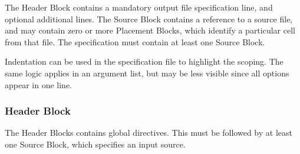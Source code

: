 The Header Block contains a mandatory output file specification line,
and optional additional lines.  The Source Block contains a reference
to a source file, and may contain zero or more Placement Blocks, which
identify a particular cell from that file.  The specification must
contain at least one Source Block.

Indentation can be used in the specification file to highlight the
scoping.  The same logic applies in an argument list, but may be less
visible since all options appear in one line.

\subsubsection{Header Block}

The Header Blocks contains global directives.  This must be followed
by at least one Source Block, which specifies an input source.

